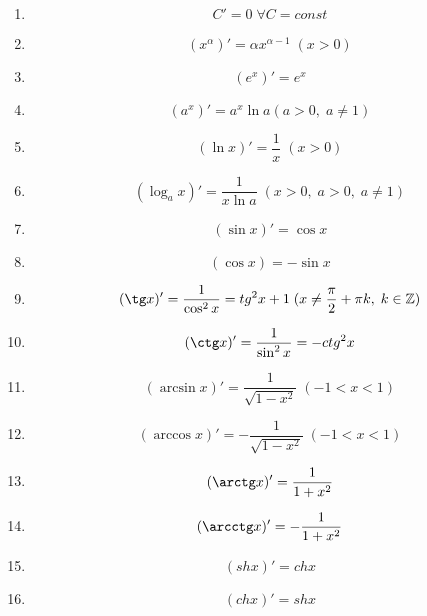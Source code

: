 

\label{sec_Definition10}
\begin{definition}
    \begin{enumerate}
        \item $$ C' = 0 \; \forall C = const $$
        \item $$ (x^{\alpha})' = \alpha x^{\alpha - 1} \; (x > 0) $$
        \item $$ (e^x)' = e^x $$
        \item $$ (a^x)' = a^x \ln a(a > 0, \; a \neq 1) $$
        \item $$ (\ln x)' = \frac{1}{x} \; (x > 0) $$
        \item $$ (\log_a x)' = \frac{1}{x \ln{a}} \; (x > 0, \; a > 0, \; a \neq 1) $$
        \item $$ (\sin x)' = \cos x $$
        \item $$ (\cos x) = - \sin x $$
        \item $$ (\tg x)' = \frac{1}{\cos^2 x} = tg^2 x + 1 \; (x \neq \frac{\pi}{2} + \pi k, \; k \in \mathbb{Z}) $$
        \item $$ (\ctg x)' = \frac{1}{\sin^2 x} = - ctg^2 x $$
        \item $$ (\arcsin x)' = \frac{1}{\sqrt{1 - x^2}} \; (-1 < x < 1) $$
        \item $$ (\arccos x)' = - \frac{1}{\sqrt{1 - x^2}} \; (-1 < x < 1) $$
        \item $$ (\arctg x)' = \frac{1}{1 + x^2} $$
        \item $$ (\arcctg x)' = - \frac{1}{1 + x^2} $$
        \item $$ (sh x)' = ch x $$
        \item $$ (ch x)' = sh x $$
    \end{enumerate}
\end{definition}